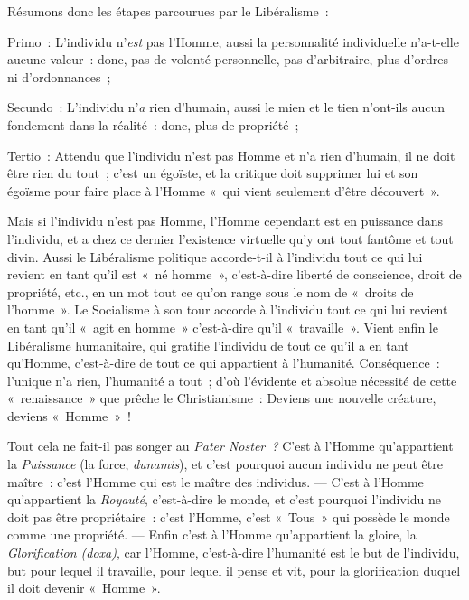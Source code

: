 \documentclass[french,twoside]{book} %
\begin{document}
Résumons donc les étapes parcourues par le Libéralisme :\par
Primo : L’individu n’\emph{est} pas l’Homme, aussi la personnalité individuelle n’a-t-elle aucune valeur : donc, pas de volonté personnelle, pas d’arbitraire, plus d’ordres ni d’ordonnances ;\par
Secundo : L’individu n’\emph{a} rien d’humain, aussi le mien et le tien n’ont-ils aucun fondement dans la réalité : donc, plus de propriété ;\par
Tertio : Attendu que l’individu n’est pas Homme et n’a rien d’humain, il ne doit être rien du tout ; c’est un égoïste, et la critique doit supprimer lui et son égoïsme pour faire place à l’Homme « qui vient seulement d’être découvert ».\par
Mais si l’individu n’est pas Homme, l’Homme cependant est en puissance dans l’individu, et a chez ce dernier l’existence virtuelle qu’y ont tout fantôme et tout divin. Aussi le Libéralisme politique accorde-t-il  à l’individu tout ce qui lui revient en tant qu’il est « né homme », c’est-à-dire liberté de conscience, droit de propriété, etc., en un mot tout ce qu’on range sous le nom de « droits de l’homme ». Le Socialisme à son tour accorde à l’individu tout ce qui lui revient en tant qu’il « agit en homme » c’est-à-dire qu’il « travaille ». Vient enfin le Libéralisme humanitaire, qui gratifie l’individu de tout ce qu’il a en tant qu’Homme, c’est-à-dire de tout ce qui appartient à l’humanité. Conséquence : l’unique n’a rien, l’humanité a tout ; d’où l’évidente et absolue nécessité de cette « renaissance » que prêche le Christianisme : Deviens une nouvelle créature, deviens « Homme » !\par
Tout cela ne fait-il pas songer au \emph{Pater Noster ?} C’est à l’Homme qu’appartient la \emph{Puissance} (la force, \emph{dunamis}), et c’est pourquoi aucun individu ne peut être maître : c’est l’Homme qui est le maître des individus. — C’est à l’Homme qu’appartient la \emph{Royauté}, c’est-à-dire le monde, et c’est pourquoi l’individu ne doit pas être propriétaire : c’est l’Homme, c’est « Tous » qui possède le monde comme une propriété. — Enfin c’est à l’Homme qu’appartient la gloire, la \emph{Glorification (doxa)}, car l’Homme, c’est-à-dire l’humanité est le but de l’individu, but pour lequel il travaille, pour lequel il pense et vit, pour la glorification duquel il doit devenir « Homme ».\par
\end{document}
